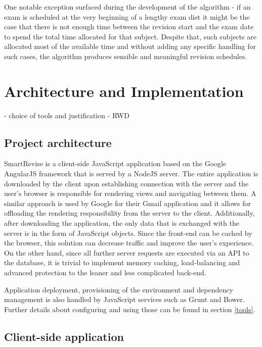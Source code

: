 \documentclass[bsc,frontabs,twoside,singlespacing,parskip]{infthesis}     %
\begin{document}
		One notable exception surfaced during the development of the algorithm - if an exam is scheduled at the very beginning of a lengthy exam diet it might be the case that there is not enough time between the revision start and the exam date to spend the total time allocated for that subject. Despite that, such subjects are allocated most of the available time and without adding any specific handling for such cases, the algorithm produces sensible and meaningful revision schedules.




\chapter{Architecture and Implementation}\label{architecture}

	- choice of tools and justification
	- RWD

	\section{Project architecture}

		SmartRevise is a client-side JavaScript application based on the Google AngularJS framework that is served by a NodeJS server. The entire application is downloaded by the client upon establishing connection with the server and the user's browser is responsible for rendering views and navigating between them. A similar approach is used by Google for their Gmail application and it allows for offloading the rendering responsibility from the server to the client. Additionally, after downloading the application, the only data that is exchanged with the server is in the form of JavaScript objects. Since the front-end can be cached by the browser, this solution can decrease traffic and improve the user's experience. On the other hand, since all further server requests are executed via an API to the database, it is trivial to implement memory caching, load-balancing and advanced protection to the leaner and less complicated back-end.

		Application deployment, provisioning of the environment and dependency management is also handled by JavaScript services such as Grunt and Bower. Further details about configuring and using those can be found in section \ref{tools}.

	\section{Client-side application}
\end{document}
